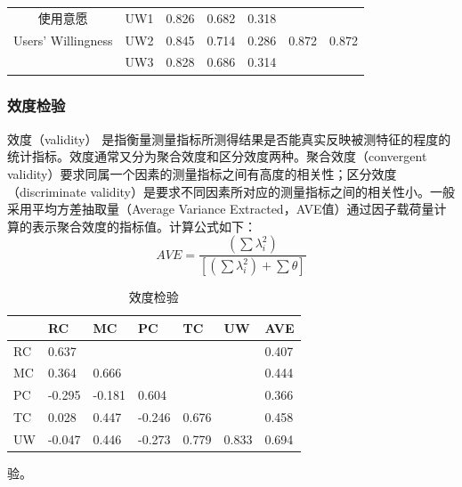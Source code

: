 \begin{table}[H]
\begin{tabular}{@{}ccccccc@{}}
使用意愿        & UW1           & 0.826                                                                & 0.682                                                                 & 0.318                                                                    &                        &                              \\
Users' Willingness          & UW2           & 0.845                                                                & 0.714                                                                 & 0.286                                                                    & 0.872                  & 0.872                        \\
            & UW3           & 0.828                                                                & 0.686                                                                 & 0.314                                                                    &                        &                              \\ \bottomrule
\end{tabular}
\end{table}
\subsubsection{效度检验}
效度（validity） 是指衡量测量指标所测得结果是否能真实反映被测特征的程度的统计指标。效度通常又分为聚合效度和区分效度两种。聚合效度（convergent validity）要求同属一个因素的测量指标之间有高度的相关性；区分效度（discriminate validity）是要求不同因素所对应的测量指标之间的相关性小。一般采用平均方差抽取量（Average Variance Extracted，AVE值）通过因子载荷量计算的表示聚合效度的指标值。计算公式如下：
\begin{equation}
    AVE=\frac{\left (  \sum \lambda _{i}^{2}\right )}{\left [\left (  \sum \lambda _{i}^{2}\right )+\sum \theta   \right ]}
\end{equation}

\begin{table}[H]
\centering
\caption{效度检验}
\label{tab:val}
\begin{tabular}{@{}lllllll@{}}
\toprule
\textbf{} & \textbf{RC} & \textbf{MC} & \textbf{PC} & \textbf{TC} & \textbf{UW} & \textbf{AVE} \\ \midrule
RC        & 0.637       &             &             &             &             & 0.407        \\
MC        & 0.364       & 0.666       &             &             &             & 0.444        \\
PC        & -0.295      & -0.181      & 0.604       &             &             & 0.366        \\
TC        & 0.028       & 0.447       & -0.246      & 0.676       &             & 0.458        \\
UW        & -0.047      & 0.446       & -0.273      & 0.779       & 0.833       & 0.694        \\ \bottomrule
\end{tabular}
\end{table}
验。
